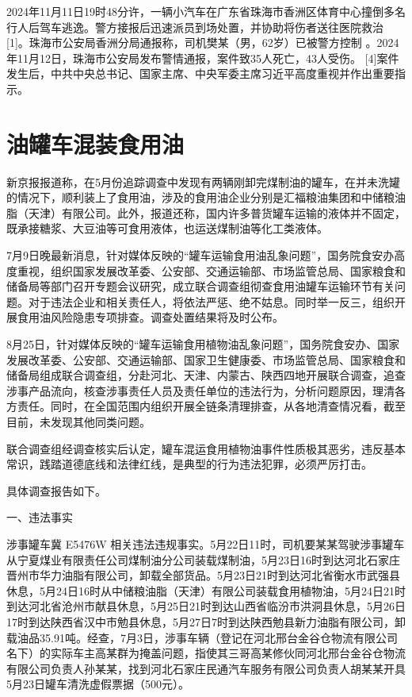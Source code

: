 2024年11月11日19时48分许，一辆小汽车在广东省珠海市香洲区体育中心撞倒多名行人后驾车逃逸。警方接报后迅速派员到场处置，并协助将伤者送往医院救治 [1]。珠海市公安局香洲分局通报称，司机樊某（男，62岁）已被警方控制 。2024年11月12日，珠海市公安局发布警情通报，案件致35人死亡，43人受伤。 [4]案件发生后，中共中央总书记、国家主席、中央军委主席习近平高度重视并作出重要指示。

\section{油罐车混装食用油}

新京报报道称，在5月份追踪调查中发现有两辆刚卸完煤制油的罐车，在并未洗罐的情况下，顺利装上了食用油，涉及的食用油企业分别是汇福粮油集团和中储粮油脂（天津）有限公司。此外，报道还称，国内许多普货罐车运输的液体并不固定，既承接糖浆、大豆油等可食用液体，也运送煤制油等化工类液体。

7月9日晚最新消息，针对媒体反映的“罐车运输食用油乱象问题”，国务院食安办高度重视，组织国家发展改革委、公安部、交通运输部、市场监管总局、国家粮食和储备局等部门召开专题会议研究，成立联合调查组彻查食用油罐车运输环节有关问题。对于违法企业和相关责任人，将依法严惩、绝不姑息。同时举一反三，组织开展食用油风险隐患专项排查。调查处置结果将及时公布。

8月25日，针对媒体反映的“罐车运输食用植物油乱象问题”，国务院食安办、国家发展改革委、公安部、交通运输部、国家卫生健康委、市场监管总局、国家粮食和储备局组成联合调查组，分赴河北、天津、内蒙古、陕西四地开展联合调查，追查涉事产品流向，核查涉事责任人员及责任单位的违法行为，分析问题原因，理清各方责任。同时，在全国范围内组织开展全链条清理排查，从各地清查情况看，截至目前，未发现其他同类问题。

联合调查组经调查核实后认定，罐车混运食用植物油事件性质极其恶劣，违反基本常识，践踏道德底线和法律红线，是典型的行为违法犯罪，必须严厉打击。

具体调查报告如下。

一、违法事实

涉事罐车冀 E5476W 相关违法违规事实。5月22日11时，司机要某某驾驶涉事罐车从宁夏煤业有限责任公司煤制油分公司装载煤制油，5月23日16时到达河北石家庄晋州市华力油脂有限公司，卸载全部货品。5月23日21时到达河北省衡水市武强县休息，5月24日16时从中储粮油脂（天津）有限公司装载食用植物油，5月24日21时到达河北省沧州市献县休息，5月25日21时到达山西省临汾市洪洞县休息，5月26日17时到达陕西省汉中市勉县休息，5月27日7时到达陕西勉县新力油脂有限公司，卸载油品35.91吨。经查，7月3日，涉事车辆（登记在河北邢台金谷仓物流有限公司名下）的实际车主高某群为掩盖问题，指使其三哥高某修伙同河北邢台金谷仓物流有限公司负责人孙某某，找到河北石家庄民通汽车服务有限公司负责人胡某某开具5月23日罐车清洗虚假票据（500元）。

